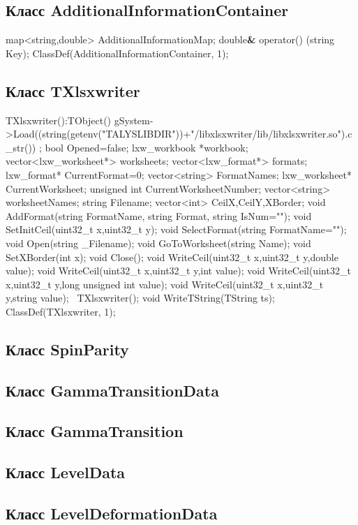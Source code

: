 \documentclass[a4paper,12pt]{extarticle}
\begin{document}
\subsection{Класс AdditionalInformationContainer}
map<string,double> AdditionalInformationMap;
double\textbf{\&} operator() (string Key);
ClassDef(AdditionalInformationContainer, 1);

\subsection{Класс TXlsxwriter}
TXlsxwriter():TObject() {gSystem->Load((string(getenv("TALYSLIBDIR"))+"/libxlsxwriter/lib/libxlsxwriter.so").c_str()) ;}
bool Opened=false;
lxw_workbook  *workbook;
vector<lxw_worksheet*> worksheets;
vector<lxw_format*> formats;
lxw_format* CurrentFormat=0;
vector<string> FormatNames;
lxw_worksheet* CurrentWorksheet;
unsigned int CurrentWorksheetNumber;
vector<string> worksheetNames;
string Filename;
vector<int> CeilX,CeilY,XBorder;
void AddFormat(string FormatName, string Format, string IsNum="");
void SetInitCeil(uint32_t x,uint32_t y);
void SelectFormat(string FormatName="");
void Open(string _Filename);
void GoToWorksheet(string Name);
void SetXBorder(int x);
void Close();
void WriteCeil(uint32_t x,uint32_t y,double value);
void WriteCeil(uint32_t x,uint32_t y,int value);
void WriteCeil(uint32_t x,uint32_t y,long unsigned int value);
void WriteCeil(uint32_t x,uint32_t y,string value);
~TXlsxwriter();
void WriteTString(TString ts);
ClassDef(TXlsxwriter, 1);

\subsection{Класс SpinParity}

\subsection{Класс GammaTransitionData}

\subsection{Класс GammaTransition}

\subsection{Класс LevelData}

\subsection{Класс LevelDeformationData}
\end{document}
